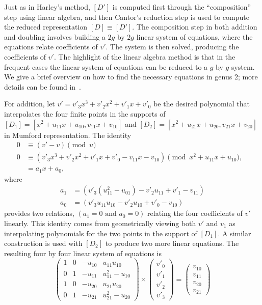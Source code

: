 Just as in Harley's method, $[D']$ is computed first through the ``composition''
step using linear algebra, and then Cantor's reduction step is used to compute
the reduced representation $[D] \equiv [D']$. The composition step in both
addition and doubling involves building a $2g$ by $2g$ linear system of
equations, where the equations relate coefficients of $v'$. The system is then
solved, producing the coefficients of $v'$. The highlight of the linear algebra
method is that in the frequent cases the linear system of equations can be
reduced to a $g$ by $g$ system. We give a brief overview on how to find the
necessary equations in genus 2; more details can be found
in~\cite{CostelloLauter_geo_2011}.


For addition, let $v' = v'_3x^3 + v'_2x^2 + v'_1x + v'_0$ be the desired
polynomial that interpolates the four finite points in the supports of
$[D_1]=[x^2 + u_{11}x + u_{10}, v_{11}x + v_{10}]$ and $[D_2] =[x^2 + u_{21}x +
u_{20}, v_{21}x + v_{20}]$ in Mumford representation. The identity 
\begin{align}
0 &\equiv (v' - v) \pmod{u} \nonumber\\
0 &\equiv (v'_3x^3 + v'_2x^2 + v'_1x + v'_0 - v_{11}x - v_{10}) \pmod{x^2 + u_{11}x + u_{10}}, \label{eqn:geo1}  \\ 
& = a_1x + a_0, & \nonumber
\end{align} 
where \begin{align}
a_1 &= (v'_3(u_{11}^2 - u_{01}) - v'_2u_{11} + v'_1 - v_{11})  \nonumber\\
a_0 &= (v'_3u_{11}u_{10} - v'_2u_{10} + v'_0 - v_{10}) \nonumber
\end{align} 
provides two relations, $(a_1 = 0 \mbox{ and } a_0 = 0)$ relating the four
coefficients of $v'$ linearly. This identity comes from geometrically viewing
both $v'$ and $v_1$ as interpolating polynomials for the two points in the
support of $[D_1]$. A similar construction is used with $[D_2]$ to produce two
more linear equations. The resulting four by four linear system of equations is
\begin{equation*}
\left( \begin{array}{cccc}
1 & 0 & -u_{10} & u_{11}u_{10}   \\
0 & 1 & -u_{11} & u_{11}^2 - u_{10} \\
1 & 0 & -u_{20} & u_{21}u_{20}   \\
0 & 1 & -u_{21} & u^2_{21} - u_{20}  \end{array} \right) \times \left( 
  \begin{array}{c}
v'_0 \\
v'_1 \\
v'_2 \\
v'_3 \end{array} \right) = \left( \begin{array}{c}
v_{10}   \\
v_{11}   \\
v_{20}  \\
v_{21}  \end{array} \right) \label{eq:addsystem}
\end{equation*} 
